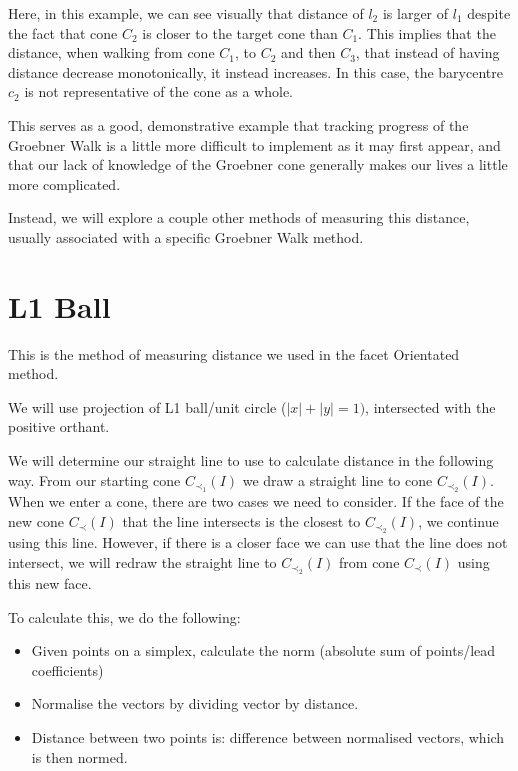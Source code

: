 \documentclass[12pt,a4paper]{report}
\begin{document}
Here, in this example, we can see visually that distance of $l_{2}$ is larger of $l_{1}$ despite the fact that cone $C_{2}$ is closer to the target cone than $C_{1}$. This implies that the distance, when walking from cone $C_{1}$, to $C_{2}$ and then $C_{3}$, that instead of having distance decrease monotonically, it instead increases. In this case, the barycentre $c_{2}$ is not representative of the cone as a whole. 

This serves as a good, demonstrative example that tracking progress of the Groebner Walk is a little more difficult to implement as it may first appear, and that our lack of knowledge of the Groebner cone generally makes our lives a little more complicated.

Instead, we will explore a couple other methods of measuring this distance, usually associated with a specific Groebner Walk method.

\section{L1 Ball}
This is the method of measuring distance we used in the facet Orientated method.

We will use projection of L1 ball/unit circle ($|x| + |y| = 1)$, intersected with the positive orthant.


We will determine our straight line to use to calculate distance in the following way. From our starting cone $C_{\prec_{1}} (I)$ we draw a straight line to cone $C_{\prec_{2}} (I)$. When we enter a cone, there are two cases we need to consider. If the face of the new cone $C_{\prec} (I)$ that the line intersects is the closest to $C_{\prec_{2}} (I)$, we continue using this line. However, if there is a closer face we can use that the line does not intersect, we will redraw the straight line to $C_{\prec_{2}} (I)$ from cone $C_{\prec} (I)$ using this new face.

To calculate this, we do the following:
\begin{itemize}
    \item Given points on a simplex, calculate the norm (absolute sum of points/lead coefficients)
    \item Normalise the vectors by dividing vector by distance.
    \item Distance between two points is: difference between normalised vectors, which is then normed. 
\end{itemize}
\end{document}
